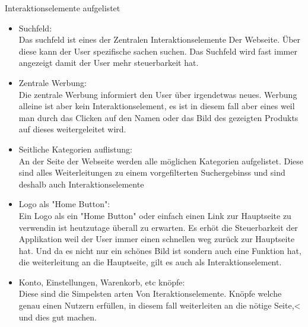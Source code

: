 \documentclass[10pt]{article}
\begin{document}
	Interaktionselemente aufgelistet
	\begin{itemize}
		\item Suchfeld:\\
		Das suchfeld ist eines der Zentralen Interaktionselemente Der Webseite. Über diese kann der User spezifische sachen suchen. Das Suchfeld wird fast immer angezeigt damit der User mehr steuerbarkeit hat.
		\item Zentrale Werbung:\\
		Die zentrale Werbung informiert den User über irgendetwas neues. Werbung alleine ist aber kein Interaktionselement, es ist in diesem fall aber eines weil man durch das Clicken auf den Namen oder das Bild des gezeigten Produkts auf dieses weitergeleitet wird.
		\item Seitliche Kategorien auflistung:\\
		An der Seite der Webseite werden alle möglichen Kategorien aufgelistet. Diese sind alles Weiterleitungen zu einem vorgefilterten Suchergebinss und sind deshalb auch Interaktionselemente
		\item Logo als "Home Button":\\
		Ein Logo als ein "Home Button" oder einfach einen Link zur Hauptseite zu verwendin ist heutzutage überall zu erwarten. Es erhöt die Steuerbarkeit der Applikation weil der User immer einen schnellen weg zurück zur Hauptseite hat. Und da es nicht nur ein schönes Bild ist sondern auch eine Funktion hat, die weiterleitung an die Hauptseite, gilt es auch als Interaktionselement.
		\item Konto, Einstellungen, Warenkorb, etc knöpfe:\\
		Diese sind die Simpelsten arten Von Iteraktionselemente. Knöpfe welche genau einen Nutzern erfüllen, in diesem fall weiterleiten an die nötige Seite,< und dies gut machen.
	\end{itemize}
\end{document}

